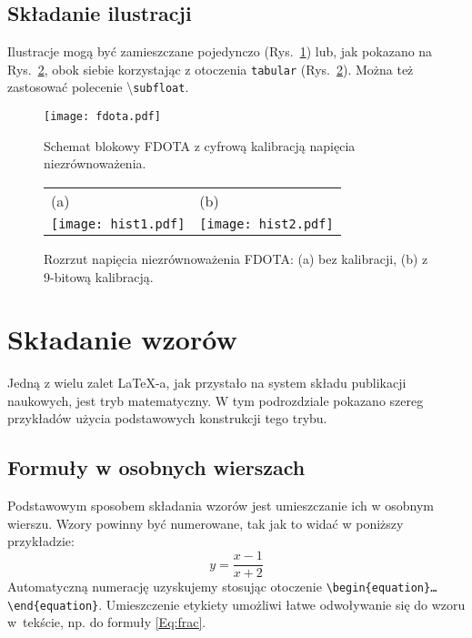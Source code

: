 \subsection{Składanie ilustracji}
Ilustracje mogą być zamieszczane pojedynczo (Rys.~\ref{fig:fdota}) lub, jak pokazano na Rys.~\ref{fig:otah1},  obok siebie korzystając z otoczenia \texttt{tabular} (Rys.~\ref{fig:otah1}). Można też  zastosować polecenie \textbackslash \texttt{subfloat}.
\begin{figure}[!h]
\begin{center}
\texttt{[image: fdota.pdf]}\\
\end{center}
\caption 
{ \label{fig:fdota} 
Schemat blokowy FDOTA z cyfrową kalibracją napięcia niezrównoważenia.}
\end{figure}
\begin{figure}[!h]
  \begin{center}
  	\setlength{\tabcolsep}{0pt}
  	\begin{tabular}{ll}
  		(a) & (b)\\
  		\texttt{[image: hist1.pdf]}&
  		\texttt{[image: hist2.pdf]}\\
  	\end{tabular}
  \end{center}
\caption
{ \label{fig:otah1} 
Rozrzut napięcia niezrównoważenia FDOTA: (a) bez kalibracji, (b) z 9-bitową kalibracją.}
\end{figure} 


\pagebreak


\section{Składanie wzorów}
\label{sec:wzory}
Jedną z wielu zalet {\LaTeX}-a, jak przystało na system składu publikacji naukowych, jest tryb matematyczny. W tym podrozdziale pokazano szereg przykładów użycia podstawowych konstrukcji tego trybu.

\subsection{Formuły w osobnych wierszach}
Podstawowym sposobem składania wzorów jest umieszczanie ich w osobnym wierszu. Wzory powinny być numerowane, tak jak to widać w poniższy przykładzie:
\begin{equation}
y= \frac{x-1}{x+2} 
\end{equation}
Automatyczną numerację uzyskujemy stosując otoczenie \texttt{\textbackslash begin\{equation\}\dots\textbackslash end\{equation\}}.
Umieszczenie etykiety umożliwi łatwe odwoływanie się do wzoru w~tekście, np. do formuły \ref{Eq:frac}.

